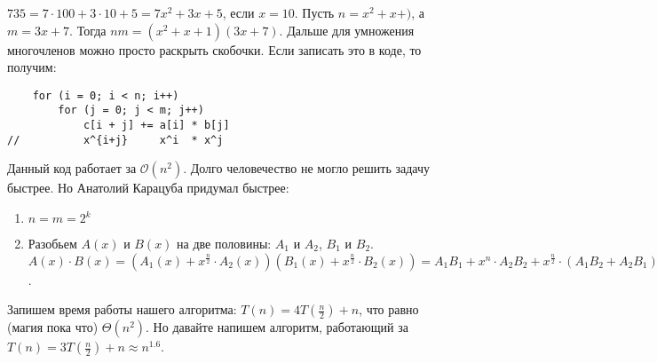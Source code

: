 $735 = 7 \cdot 100 + 3 \cdot 10 + 5 = 7x^2 + 3x + 5$, если $x=10$.
Пусть $n=x^2+x+)$, а $m=3x+7$. Тогда  $nm = (x^2+x+1)(3x+7)$. Дальше для умножения многочленов можно просто раскрыть скобочки. Если записать это в коде, то получим:
\begin{lstlisting}
    for (i = 0; i < n; i++)
        for (j = 0; j < m; j++)
            c[i + j] += a[i] * b[j]
//          x^{i+j}     x^i  * x^j
\end{lstlisting}
Данный код работает за $\mathcal{O}(n^2)$. Долго человечество не могло решить задачу быстрее. Но Анатолий Карацуба придумал быстрее:
\begin{enumerate}
    \item $n = m = 2^k$ 
    \item Разобьем $A(x)$ и $B(x)$ на две половины: $A_1$ и $A_2$, $B_1$ и $B_2$.\\
        $A(x) \cdot B(x) = (A_1(x)+ x^{\frac{n}{2}} \cdot A_2(x))(B_1(x) + x^{\frac{n}{2}} \cdot B_2(x)) = A_1B_1 + x^{n} \cdot A_2B_2 + x^{\frac{n}{2}} \cdot (A_1B_2+A_2B_1)$.
\end{enumerate}

Запишем время работы нашего алгоритма: $T(n) = 4T(\frac{n}{2}) + n$, что равно (магия пока что) $\Theta(n^2)$. Но давайте напишем алгоритм, работающий за $T(n) = 3T(\frac{n}{2})+n \approx n^{1.6}$.

